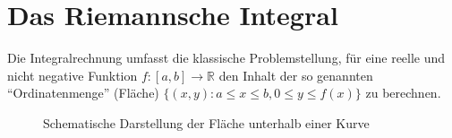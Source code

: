 \documentclass[ngerman,titlepage,twoside, parskip=half*]{scrreprt}
\newcommand*{\R}{\mathbb{R}}
\theoremstyle{break}
\theoremstyle{nonumberbreak}
\begin{document}
\section{Das Riemannsche Integral}
Die Integralrechnung umfasst die klassische Problemstellung, für eine
reelle und nicht negative Funktion $f\colon[a,b]\rightarrow\R$ den
Inhalt der so genannten "`Ordinatenmenge"' (Fläche) $\{(x,y)\colon
a\leq x\leq b, 0\leq y\leq f(x)\}$ zu berechnen.

\begin{figure}[htb]
  \centering
  \caption{Schematische Darstellung der Fläche unterhalb einer Kurve}
  \label{fig:riemann}
\end{figure}
\end{document}
